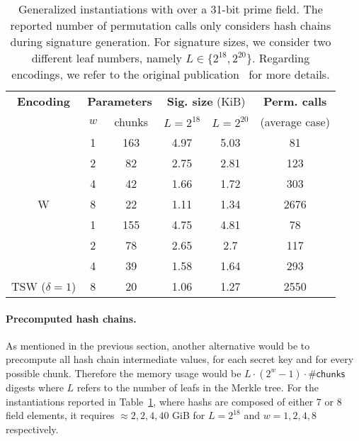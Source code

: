 
\renewcommand\arraystretch{1.25}
\begin{table}[h]
	\centering
	\begin{tabular}{cccccc}
		\toprule
    		\textbf{Encoding} & \multicolumn{2}{c}{\textbf{Parameters}} & \multicolumn{2}{c}{\textbf{Sig. size} (KiB)}  & \textbf{Perm. calls} \\
    		 & {$w$} & chunks  & $L=2^{18}$ & $ L=2^{20}$ & (average case)   \\
    		\midrule
	     &  1 & 163 & 4.97 & 5.03 & 81    \\
	     &  2 & 82  & 2.75 & 2.81 & 123 \\
	     &  4 & 42  & 1.66 & 1.72 & 303 \\
	 \multirow{-4}{*}{W}  & 8 & 22 & 1.11 & 1.34 & 2676 \\
	 \midrule
 	   &  1 & 155 & 4.75 & 4.81 & 78   \\
	   &  2 & 78  & 2.65 & 2.7  & 117  \\
	   &  4 & 39  & 1.58 & 1.64 & 293  \\
	 \multirow{-4}{*}{TSW ($\delta = 1$)}  &  8 & 20 & 1.06 & 1.27 & 2550  \\
	\hline
	\end{tabular}
	\caption{Generalized \XMSS instantiations with \PoseidonTwo over a 31-bit prime field. The reported number of permutation calls only considers hash chains during signature generation. For signature sizes, we consider two different leaf numbers, namely $L \in \{2^{18}, 2^{20}\}$. Regarding encodings, we refer to the original publication~\cite{cryptoeprint:2025/055} for more details.\label{tab:xmss_poseidon2_permcalls}}
\end{table}

\newpage

\paragraph{Precomputed hash chains.}
As mentioned in the previous section, another alternative would be to precompute all hash chain intermediate values, for each secret key and for every possible chunk.
Therefore the memory usage would be $L \cdot (2^w-1) \cdot \#\mathsf{chunks}$ digests where $L$ refers to the number of leafs in the Merkle tree.
For the instantiations reported in Table~\ref{tab:xmss_poseidon2_permcalls}, where hashs are composed of either 7 or 8 field elements, it requires $\approx 2, 2, 4, 40$ GiB for $L= 2^{18}$ and $w = 1, 2, 4, 8$ respectively.

